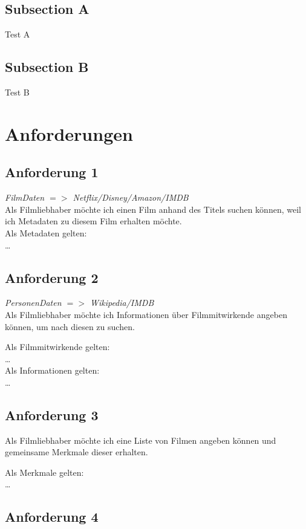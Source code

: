 \documentclass[conference]{IEEEtran}
\begin{document}
\subsection{Subsection A}

Test A

\subsection{Subsection B}

Test B

\section{Anforderungen}

\subsection{Anforderung 1}
\textit{FilmDaten $=>$ Netflix/Disney/Amazon/IMDB} 
\\
Als Filmliebhaber möchte ich einen Film anhand des Titels suchen können,
weil ich Metadaten zu diesem Film erhalten möchte.
\\
Als Metadaten gelten:
\\
\dots

\subsection{Anforderung 2}
\textit{PersonenDaten $=>$ Wikipedia/IMDB}
\\
Als Filmliebhaber möchte ich Informationen über Filmmitwirkende angeben können,
um nach diesen zu suchen.

Als Filmmitwirkende gelten:
\\
\dots
\\
Als Informationen gelten:
\\
\dots
\\

\subsection{Anforderung 3}

Als Filmliebhaber möchte ich eine Liste von Filmen angeben können
und gemeinsame Merkmale dieser erhalten.

Als Merkmale gelten:
\\
\dots
\\

\subsection{Anforderung 4}
\end{document}
